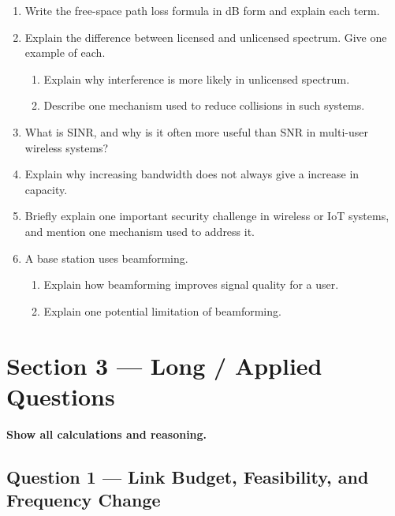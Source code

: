 \documentclass[11pt,a4paper]{article}
\begin{document}
\begin{enumerate}[leftmargin=0.9cm]

\item Write the free-space path loss formula in dB form and explain each term.

\item Explain the difference between licensed and unlicensed spectrum. Give one example of each.

\begin{enumerate}[label=\alph*)]
    \item Explain why interference is more likely in unlicensed spectrum.
    \item Describe one mechanism used to reduce collisions in such systems.
\end{enumerate}

\item What is SINR, and why is it often more useful than SNR in multi-user wireless systems?

\item Explain why increasing bandwidth does not always give a increase in capacity.

\item Briefly explain one important security challenge in wireless or IoT systems, and mention one mechanism used to address it.

\item A base station uses beamforming.

\begin{enumerate}[label=\alph*)]
    \item Explain how beamforming improves signal quality for a user.
    \item Explain one potential limitation of beamforming.
\end{enumerate}
\end{enumerate}

\newpage

\section*{Section 3 --- Long / Applied Questions}

\textbf{Show all calculations and reasoning.}

\subsection*{Question 1 --- Link Budget, Feasibility, and Frequency Change}
\end{document}

